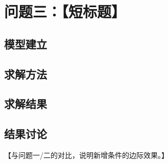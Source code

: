 \section{问题三：【短标题】}

\subsection{模型建立}

\subsection{求解方法}

\subsection{求解结果}

\subsection{结果讨论}

【与问题一/二的对比，说明新增条件的边际效果。】
